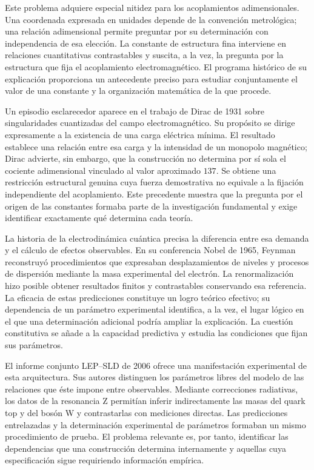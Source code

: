 Este problema adquiere especial nitidez para los acoplamientos adimensionales.
Una coordenada expresada en unidades depende de la convención metrológica;
una relación adimensional permite preguntar por su determinación con
independencia de esa elección. La constante de estructura fina interviene
en relaciones cuantitativas contrastables y suscita, a la vez, la pregunta
por la estructura que fija el acoplamiento electromagnético. El programa
histórico de su explicación proporciona un antecedente preciso para
estudiar conjuntamente el valor de una constante y la organización
matemática de la que procede.

Un episodio esclarecedor aparece en el trabajo de Dirac de 1931 sobre
singularidades cuantizadas del campo electromagnético. Su propósito se
dirige expresamente a la existencia de una carga eléctrica mínima. El
resultado establece una relación entre esa carga y la intensidad de un
monopolo magnético; Dirac advierte, sin embargo, que la construcción no
determina por sí sola el cociente adimensional vinculado al valor
aproximado \(137\)\cite{dirac1931}. Se obtiene una restricción estructural
genuina cuya fuerza demostrativa no equivale a la fijación independiente
del acoplamiento. Este precedente muestra que la pregunta por el origen
de las constantes formaba parte de la investigación fundamental y exige
identificar exactamente qué determina cada teoría.

La historia de la electrodinámica cuántica precisa la diferencia entre
esa demanda y el cálculo de efectos observables. En su conferencia Nobel
de 1965, Feynman reconstruyó procedimientos que expresaban desplazamientos
de niveles y procesos de dispersión mediante la masa experimental del
electrón\cite{feynman1965}. La renormalización hizo posible obtener
resultados finitos y contrastables conservando esa referencia. La eficacia
de estas predicciones constituye un logro teórico efectivo; su dependencia
de un parámetro experimental identifica, a la vez, el lugar lógico en el
que una determinación adicional podría ampliar la explicación. La
cuestión constitutiva se añade a la capacidad predictiva y estudia las
condiciones que fijan sus parámetros.

El informe conjunto LEP--SLD de 2006 ofrece una manifestación experimental
de esta arquitectura\cite{lep2006}. Sus autores distinguen los parámetros
libres del modelo de las relaciones que éste impone entre observables.
Mediante correcciones radiativas, los datos de la resonancia Z permitían
inferir indirectamente las masas del quark top y del bosón W y contrastarlas
con mediciones directas. Las predicciones entrelazadas y la determinación
experimental de parámetros formaban un mismo procedimiento de prueba.
El problema relevante es, por tanto, identificar las dependencias que una
construcción determina internamente y aquellas cuya especificación sigue
requiriendo información empírica.

